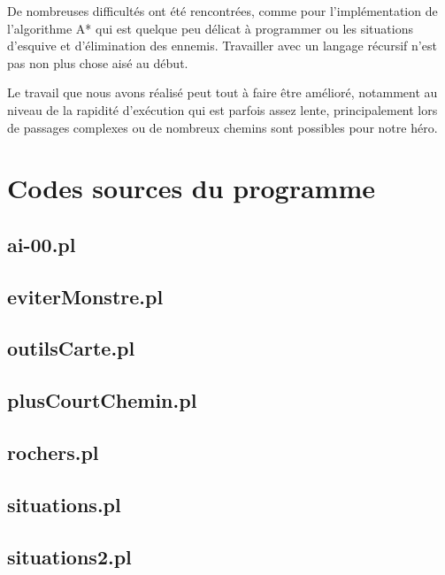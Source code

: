 \documentclass[a4paper,11pt]{article}
\begin{document}
De nombreuses difficult\'es ont \'et\'e rencontr\'ees, comme pour l'impl\'ementation de l'algorithme A* qui est quelque peu d\'elicat \`a programmer ou les situations d'esquive et d'\'elimination des ennemis. Travailler avec un langage r\'ecursif n'est pas non plus chose ais\'e au d\'ebut.

Le travail que nous avons r\'ealis\'e peut tout \`a faire \^etre am\'elior\'e, notamment au niveau de la rapidit\'e d'ex\'ecution qui est parfois assez lente, principalement lors de passages complexes ou de nombreux chemins sont possibles pour notre h\'ero.  
	


\newpage
\section{Codes sources du programme}

\subsection{ai-00.pl}


\newpage
\subsection{eviterMonstre.pl}


\newpage
\subsection{outilsCarte.pl}


\newpage
\subsection{plusCourtChemin.pl}


\newpage
\subsection{rochers.pl}


\newpage
\subsection{situations.pl}


\newpage
\subsection{situations2.pl}


\newpage
\tableofcontents
\end{document}
